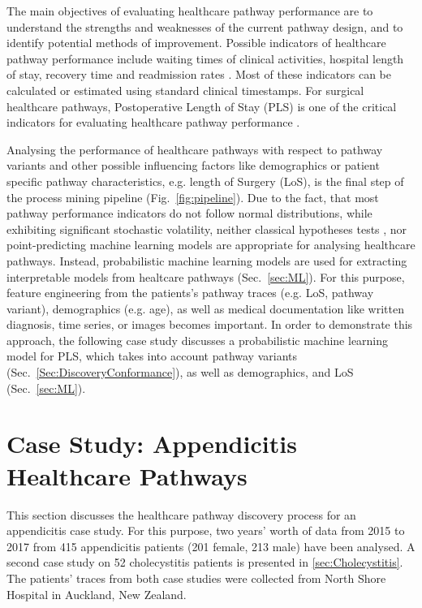 The main objectives of evaluating healthcare pathway performance are
to understand the strengths and weaknesses of the current pathway design,
and to identify potential methods of improvement. Possible indicators
of healthcare pathway performance include waiting times of clinical
activities, hospital length of stay, recovery time and readmission
rates \cite{Rotter2008_pathways}.
Most of these indicators can be calculated or estimated using standard clinical timestamps.
For surgical healthcare pathways, Postoperative Length of Stay (PLS)
is one of the critical indicators for evaluating healthcare pathway
performance \cite{Pearson2001_pathways}.

Analysing the performance of healthcare pathways with respect to
pathway variants and other possible influencing factors like
demographics or patient specific pathway characteristics, e.g. length
of Surgery (LoS), is the final step of the process mining pipeline
(Fig.~\ref{fig:pipeline}).
Due to the fact, that most pathway performance indicators do not
follow normal distributions, while exhibiting significant stochastic
volatility, neither classical hypotheses tests \cite{Goodman2008_p-value}, nor point-predicting
machine learning models are appropriate for analysing healthcare
pathways.
Instead, probabilistic machine learning models
\cite{Ghahramani2015_PML} are used for extracting interpretable models
from healtcare pathways (Sec.~\ref{sec:ML}).
For this purpose, feature engineering \cite{DongLiu2018_FE} from
the patients's pathway traces (e.g. LoS, pathway variant),
demographics (e.g. age), as well as medical documentation like written
diagnosis, time series, or images becomes important.
In order to demonstrate this approach, the following case study
discusses a probabilistic machine learning model for PLS, which
takes into account pathway variants
(Sec.~\ref{Sec:DiscoveryConformance}), as well as demographics, and
LoS (Sec.~\ref{sec:ML}).

\section{Case Study: Appendicitis Healthcare Pathways}
This section discusses the healthcare pathway discovery process for an
appendicitis case study. For this purpose, two years’ worth of data
from 2015 to 2017 from 415 appendicitis patients (201 female, 213
male) %
have been analysed. 
A second case study on 52 cholecystitis patients is presented in \ref{sec:Cholecystitis}.
The patients' traces from both case studies were collected from North Shore Hospital in Auckland, New Zealand.

